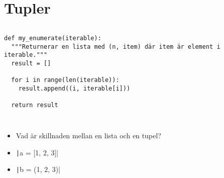 \mode*

\section{Tupler}

\begin{frame}[fragile]
  \begin{example}[tuples.py]
    \inputminted{python}{examples/tuples.py}
  \end{example}

  \pause

  \begin{example}
    \begin{verbatim}
def my_enumerate(iterable):
  """Returnerar en lista med (n, item) där item är element i iterable."""
  result = []

  for i in range(len(iterable)):
    result.append((i, iterable[i]))

  return result
    \end{verbatim}
  \end{example}
\end{frame}

\begin{frame}[fragile]
  \begin{example}[fullname.py]
    \inputminted[firstline=3,lastline=7]{python}{examples/fullname.py}
  \end{example}

  \pause

  \begin{example}
    \inputminted[firstline=3,lastline=7,highlightlines=7]{python}{examples/fullname-alt.py}
  \end{example}
\end{frame}

\begin{frame}[fragile]
  \begin{exercise}
    \begin{itemize}
      \item Vad är skillnaden mellan en lista och en tupel?
      \item \texttt|a = [1, 2, 3]|
      \item \texttt|b = (1, 2, 3)|
    \end{itemize}
  \end{exercise}
\end{frame}

